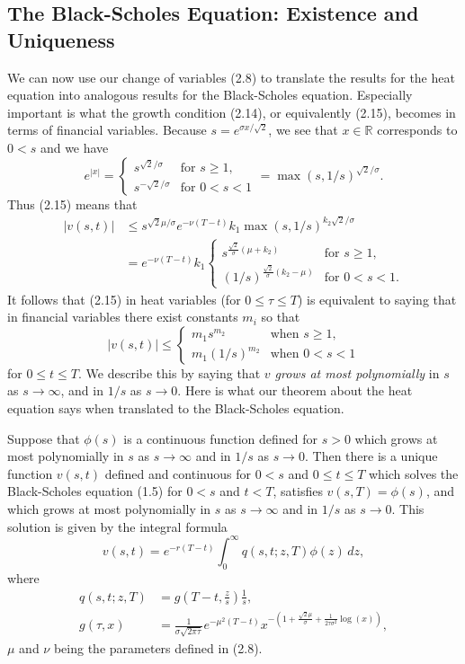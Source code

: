 \subsection{The Black-Scholes Equation: Existence and Uniqueness}

We can now use our change of variables (2.8) to translate the results for the heat equation into analogous results for the Black-Scholes equation. Especially important is what the growth condition (2.14), or equivalently (2.15), becomes in terms of financial variables. Because \(s = e^{\sigma x / \sqrt{2}}\), we see that \(x \in \mathbb{R}\) corresponds to \(0 < s\) and we have
\[
e^{|x|} = \begin{cases}
s^{\sqrt{2}/\sigma} & \text{for } s \geq 1, \\
s^{-\sqrt{2}/\sigma} & \text{for } 0 < s < 1
\end{cases} = \max(s, 1/s)^{\sqrt{2}/\sigma}.
\]
Thus (2.15) means that
\begin{align*}
|v(s,t)| &\leq s^{\sqrt{2} \mu / \sigma} e^{-\nu (T-t)} k_1 \max(s, 1/s)^{k_2 \sqrt{2}/\sigma} \\
&= e^{-\nu (T-t)} k_1 \begin{cases}
s^{\frac{\sqrt{2}}{\sigma}(\mu + k_2)} & \text{for } s \geq 1, \\
(1/s)^{\frac{\sqrt{2}}{\sigma}(k_2 - \mu)} & \text{for } 0 < s < 1.
\end{cases}
\end{align*}
It follows that (2.15) in heat variables (for \(0 \leq \tau \leq T\)) is equivalent to saying that in financial variables there exist constants \(m_i\) so that
\[
|v(s,t)| \leq \begin{cases}
m_1 s^{m_2} & \text{when } s \geq 1, \\
m_1 (1/s)^{m_2} & \text{when } 0 < s < 1
\end{cases} \tag{2.17}
\]
for \(0 \leq t \leq T\). We describe this by saying that \textit{\(v\) grows at most polynomially} in \(s\) as \(s \to \infty\), and in \(1/s\) as \(s \to 0\). Here is what our theorem about the heat equation says when translated to the Black-Scholes equation.

\begin{theorem}
Suppose that \(\phi(s)\) is a continuous function defined for \(s > 0\) which grows at most polynomially in \(s\) as \(s \to \infty\) and in \(1/s\) as \(s \to 0\). Then there is a unique function \(v(s,t)\) defined and continuous for \(0 < s\) and \(0 \leq t \leq T\) which solves the Black-Scholes equation (1.5) for \(0 < s\) and \(t < T\), satisfies \(v(s,T) = \phi(s)\), and which grows at most polynomially in \(s\) as \(s \to \infty\) and in \(1/s\) as \(s \to 0\). This solution is given by the integral formula
\[
v(s,t) = e^{-r(T-t)} \int_0^{\infty} q(s,t; z,T) \phi(z) \, dz, \tag{2.18}
\]
where
\begin{align*}
q(s,t; z,T) &= g(T-t, \frac{z}{s}) \frac{1}{s}, \\
g(\tau,x) &= \frac{1}{\sigma \sqrt{2\pi \tau}} e^{-\mu^2 (T-t)} x^{-\left(1 + \frac{\sqrt{2}\mu}{\sigma} + \frac{1}{2\tau\sigma^2} \log(x)\right)},
\end{align*}
\(\mu\) and \(\nu\) being the parameters defined in (2.8).
\end{theorem}

